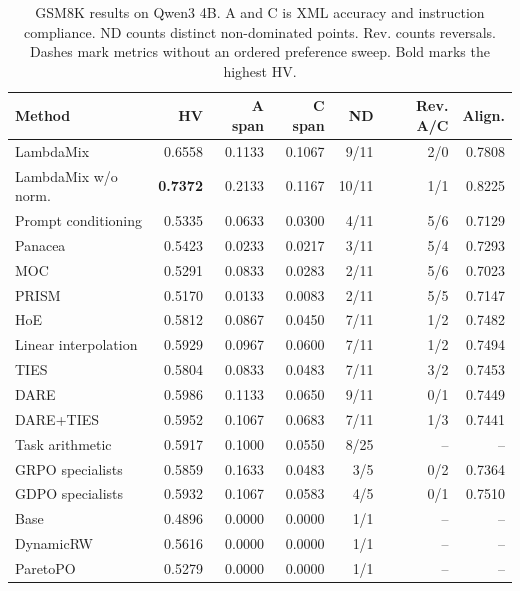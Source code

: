 \begin{table}[htbp]
\centering\small
\setlength{\tabcolsep}{3pt}
\caption{GSM8K results on Qwen3 4B. A and C is XML accuracy and instruction compliance. ND counts distinct non-dominated points. Rev. counts reversals. Dashes mark metrics without an ordered preference sweep. Bold marks the highest HV.}
\label{tab:full-gsm8k-q4}
\begin{tabular}{@{}lrrrrrr@{}}
\toprule
Method & HV & A span & C span & ND & Rev. A/C & Align.\\
\midrule
LambdaMix & 0.6558 & 0.1133 & 0.1067 & 9/11 & 2/0 & 0.7808\\
LambdaMix w/o norm. & \textbf{0.7372} & 0.2133 & 0.1167 & 10/11 & 1/1 & 0.8225\\
\midrule
Prompt conditioning & 0.5335 & 0.0633 & 0.0300 & 4/11 & 5/6 & 0.7129\\
Panacea & 0.5423 & 0.0233 & 0.0217 & 3/11 & 5/4 & 0.7293\\
MOC & 0.5291 & 0.0833 & 0.0283 & 2/11 & 5/6 & 0.7023\\
PRISM & 0.5170 & 0.0133 & 0.0083 & 2/11 & 5/5 & 0.7147\\
HoE & 0.5812 & 0.0867 & 0.0450 & 7/11 & 1/2 & 0.7482\\
\midrule
Linear interpolation & 0.5929 & 0.0967 & 0.0600 & 7/11 & 1/2 & 0.7494\\
TIES & 0.5804 & 0.0833 & 0.0483 & 7/11 & 3/2 & 0.7453\\
DARE & 0.5986 & 0.1133 & 0.0650 & 9/11 & 0/1 & 0.7449\\
DARE+TIES & 0.5952 & 0.1067 & 0.0683 & 7/11 & 1/3 & 0.7441\\
Task arithmetic & 0.5917 & 0.1000 & 0.0550 & 8/25 & -- & --\\
\midrule
GRPO specialists & 0.5859 & 0.1633 & 0.0483 & 3/5 & 0/2 & 0.7364\\
GDPO specialists & 0.5932 & 0.1067 & 0.0583 & 4/5 & 0/1 & 0.7510\\
\midrule
Base & 0.4896 & 0.0000 & 0.0000 & 1/1 & -- & --\\
DynamicRW & 0.5616 & 0.0000 & 0.0000 & 1/1 & -- & --\\
ParetoPO & 0.5279 & 0.0000 & 0.0000 & 1/1 & -- & --\\
\bottomrule
\end{tabular}
\end{table}

